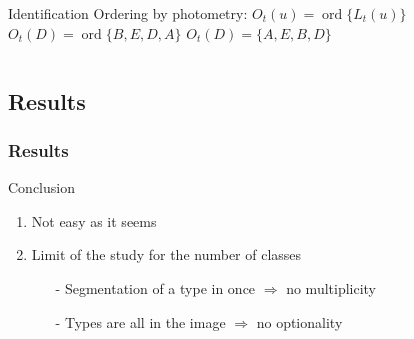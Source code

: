 \begin{frame}
\begin{columns}[c]
				\column{15em}	
				\begin{alertblock}{Identification}
				Ordering by photometry: %
				$O_t(u) = \operatorname{ord} \{ L_t(u) \}$
				$O_t(D) = \operatorname{ord} \{ B,E,D,A \}$
				$O_t(D) = \{ A, E, B, D \}$
				
				\end{alertblock}					
			\end{columns}


		\end{frame}
		


	\subsection[Results]{Results}
		\begin{frame}
			\frametitle{Results}
			\begin{block}{Conclusion}
				\begin{enumerate}
					\item Not easy as it seems
					\item Limit of the study for the number of classes
					\begin{enumerate}
						\item[-] Segmentation of a type in once $\Rightarrow$ no multiplicity
						\item[-] Types are all in the image $\Rightarrow$ no optionality
					\end{enumerate}

				\end{enumerate}
			\end{block}			
		\end{frame}
		


		



